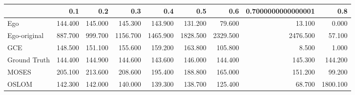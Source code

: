 \begin{tabular}{lrrrrrrrr}
\toprule
{} &     0.1 &     0.2 &      0.3 &      0.4 &      0.5 &      0.6 & 0.7000000000000001 &      0.8 \\
\midrule
Ego          & 144.400 & 145.000 &  145.300 &  143.900 &  131.200 &   79.600 &             13.100 &    0.000 \\
Ego-original & 887.700 & 999.700 & 1156.700 & 1465.900 & 1828.500 & 2329.500 &           2476.500 &   57.100 \\
GCE          & 148.500 & 151.100 &  155.600 &  159.200 &  163.800 &  105.800 &              8.500 &    1.000 \\
Ground Truth & 144.400 & 144.900 &  144.600 &  143.600 &  146.000 &  144.400 &            145.300 &  144.200 \\
MOSES        & 205.100 & 213.600 &  208.600 &  195.400 &  188.800 &  165.000 &            151.200 &   99.200 \\
OSLOM        & 142.300 & 142.000 &  140.000 &  139.300 &  138.700 &  125.400 &             68.700 & 1800.100 \\
\bottomrule
\end{tabular}
